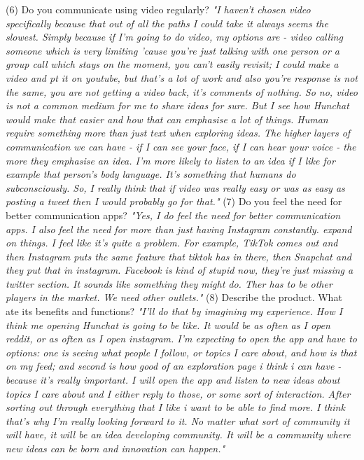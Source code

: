 \documentclass[12pt]{article}
\begin{document}
(6) Do you communicate using video regularly?  \textit{"I haven't chosen video specifically because that out of all the paths I could take it always seems the slowest. Simply because if I'm going to do video, my options are - video calling someone which is very limiting 'cause you're just talking with one person or a group call which stays on the moment, you can't easily revisit; I could make a video and pt it on youtube, but that's a lot of work and also you're response is not the same, you are not getting a video back, it's comments of nothing. So no, video is not a common medium for me to share ideas for sure. But I see how Hunchat would make that easier and how that can emphasise a lot of things. Human require something more than just text when exploring ideas. The higher layers of communication we can have - if I can see your face, if I can hear your voice - the more they emphasise an idea. I'm more likely to listen to an idea if I like for example that person's body language. It's something that humans do subconsciously. So, I really think that if video was really easy or was as easy as posting a tweet then I would probably go for that."}
(7) Do you feel the need for better communication apps? \textit{"Yes, I do feel the need for better communication apps. I also feel the need for more than just having Instagram constantly. expand on things. I feel like it's quite a problem. For example, TikTok comes out and then Instagram puts the same feature that tiktok has in there, then Snapchat and they put that in instagram. Facebook is kind of stupid now, they're just missing a twitter section. It sounds like something they might do. Ther has to be other players in the market. We need other outlets."}
(8) Describe the product. What ate its benefits and functions? \textit{"I'll do that by imagining my experience. How I think me opening Hunchat is going to be like. It would be as often as I open reddit, or as often as I open instagram. I'm expecting to open the app and have to options: one is seeing what people I follow, or topics I care about, and how is that on my feed; and second is how good of an exploration page i think i can have - because it's really important. I will open the app and listen to new ideas about topics I care about and I either reply to those, or some sort of interaction. After sorting out through everything that I like i want to be able to find more. I think that's why I'm really looking forward to it. No matter what sort of community it will have, it will be an idea developing community. It will be a community where new ideas can be born and innovation can happen."}
\end{document}
